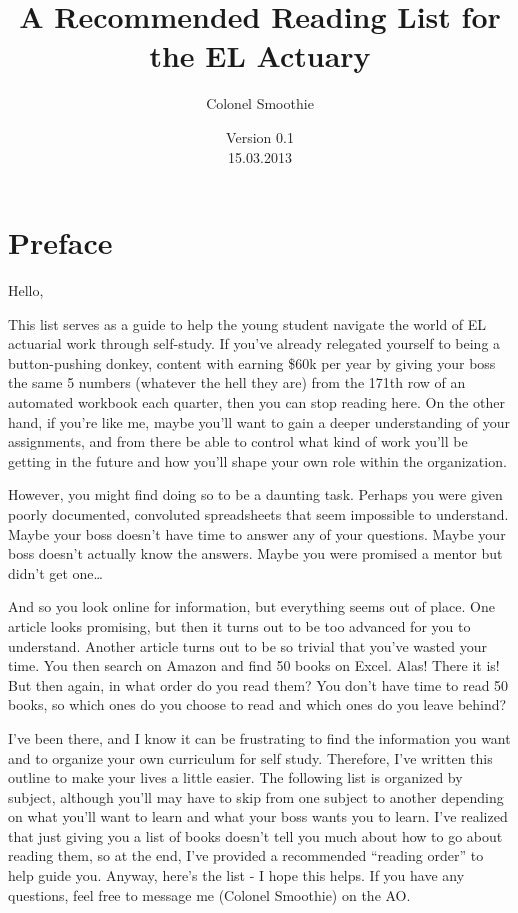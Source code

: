 \documentclass[oneside, titlepage]{article}
\begin{document}
\title{A Recommended Reading List for the EL Actuary}
\author{Colonel Smoothie}
\date{ Version 0.1\\ 15.03.2013}
\maketitle

\section*{Preface}

Hello,

This list serves as a guide to help the young student navigate the world of EL actuarial work through self-study. If you've already relegated yourself to being a button-pushing donkey, content with earning \$60k per year by giving your boss the same 5 numbers (whatever the hell they are) from the 171th row of an automated workbook each quarter, then you can stop reading here. On the other hand, if you're like me, maybe you'll want to gain a deeper understanding of your assignments, and from there be able to control what kind of work you'll be getting in the future and how you'll shape your own role within the organization.

However, you might find doing so to be a daunting task. Perhaps you were given poorly documented, convoluted spreadsheets that seem impossible to understand. Maybe your boss doesn't have time to answer any of your questions. Maybe your boss doesn't actually know the answers. Maybe you were promised a mentor but didn't get one\ldots

And so you look online for information, but everything seems out of place. One article looks promising, but then it turns out to be too advanced for you to understand. Another article turns out to be so trivial that you've wasted your time. You then search on Amazon and find 50 books on Excel. Alas! There it is! But then again, in what order do you read them? You don't have time to read 50 books, so which ones do you choose to read and which ones do you leave behind?

I've been there, and I know it can be frustrating to find the information you want and to organize your own curriculum for self study. Therefore, I've written this outline to make your lives a little easier. The following list is organized by subject, although you'll may have to skip from one subject to another depending on what you'll want to learn and what your boss wants you to learn. I've realized that just giving you a list of books doesn't tell you much about how to go about reading them, so at the end, I've provided a recommended ``reading order'' to help guide you. Anyway, here's the list - I hope this helps. If you have any questions, feel free to message me (Colonel Smoothie) on the AO.
\end{document}
